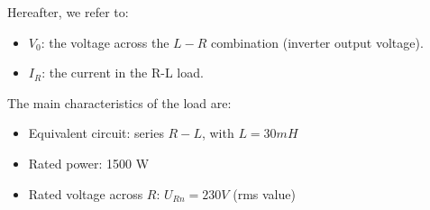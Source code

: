 Hereafter, we refer to:

\begin{itemize}
\setlength\itemsep{-1mm}
\item $V_0$: the voltage across the $L - R$ combination (inverter output voltage).
\item $I_R$: the current in the R-L load.
\end{itemize}

The main characteristics of the load are:

\begin{itemize}
\setlength\itemsep{-1mm}
\item Equivalent circuit: series $R - L$, with $L = 30 mH$
\item Rated power: 1500 W
\item Rated voltage across $R$: $U_{Rn} = 230 V$ (rms value)
\end{itemize}

